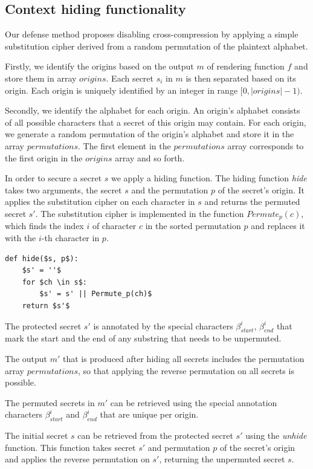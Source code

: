 \documentclass[conference, letterpaper, 10pt]{IEEEtran}
\begin{document}
\subsection{Context hiding functionality}
Our defense method proposes disabling cross-compression by applying a simple
substitution cipher derived from a random permutation of the plaintext alphabet.

Firstly, we identify the origins based on the output $m$ of rendering function
$f$ and store them in array $origins$. Each secret $s_i$ in $m$ is then
separated based on its origin. Each origin is uniquely identified by an integer
in range $[0, |origins|-1)$.

Secondly, we identify the alphabet for each origin. An origin's alphabet
consists of all possible characters that a secret of this origin may contain.
For each origin, we generate a random permutation of the origin's alphabet and
store it in the array $permutations$. The first element in the $permutations$
array corresponds to the first origin in the $origins$ array and so forth.

In order to secure a secret $s$ we apply a hiding function. The hiding function
\textit{hide} takes two arguments, the secret $s$ and the permutation $p$ of the
secret's origin. It applies the substitution cipher on each character in $s$ and
returns the permuted secret $s'$. The substitution cipher is implemented in the
function $Permute_p(c)$, which finds the index $i$ of character $c$ in the sorted
permutation $p$ and replaces it with the $i$-th character in $p$.

\begin{lstlisting}[texcl,mathescape,basicstyle=\small]
def hide($s, p$):
    $s' = ''$
    for $ch \in s$:
        $s' = s' || Permute_p(ch)$
    return $s'$
\end{lstlisting}

The protected secret $s'$ is annotated by the special characters
$\beta_{start}^i$, $\beta_{end}^i$ that mark the start and the end of any
substring that needs to be unpermuted.

The output $m'$ that is produced after hiding all secrets includes the
permutation array $permutations$, so that applying the reverse permutation on
all secrets is possible.

The permuted secrets in $m'$ can be retrieved using the special annotation
characters $\beta_{start}^i$ and $\beta_{end}^i$ that are unique per origin.

The initial secret $s$ can be retrieved from the protected secret $s'$
using the \textit{unhide} function. This function takes secret $s'$ and
permutation $p$ of the secret's origin and applies the reverse permutation on
$s'$, returning the unpermuted secret $s$.
\end{document}
